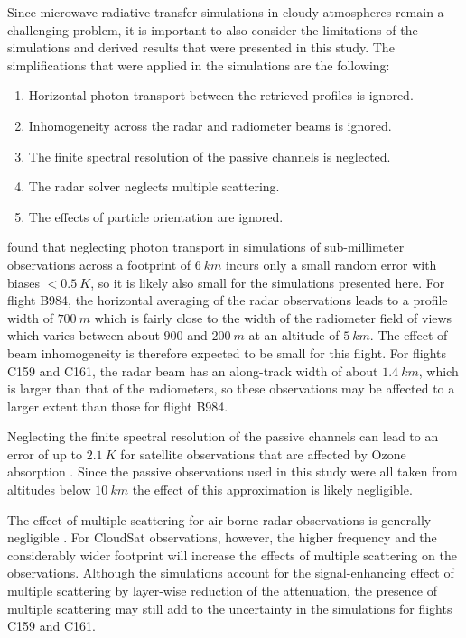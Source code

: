 \documentclass[journal abbreviation, manuscript]{copernicus}
\begin{document}
Since microwave radiative transfer simulations in cloudy atmospheres remain a
challenging problem, it is important to also consider the limitations of the
simulations and derived results that were presented in this study. The
simplifications that were applied in the simulations are the following:
\begin{enumerate}
  \item Horizontal photon transport between the retrieved profiles is ignored.
  \item Inhomogeneity across the radar and radiometer beams is ignored.
  \item The finite spectral resolution of the passive channels is neglected.
  \item The radar solver neglects multiple scattering.
  \item The effects of particle orientation are ignored.
\end{enumerate}

\citet{barlakas20} found that neglecting photon transport in simulations of
sub-millimeter observations across a footprint of $6\ \unit{km}$ incurs only a
small random error with biases $< 0.5\ \unit{K}$, so it is likely also small for
the simulations presented here. For flight B984, the horizontal averaging of the
radar observations leads to a profile width of $700\ \unit{m}$ which is fairly
close to the width of the radiometer field of views which varies between about
$900$ and $200\ \unit{m}$ at an altitude of $5\ \unit{km}$. The effect of beam
inhomogeneity is therefore expected to be small for this flight. For flights
C159 and C161, the radar beam has an along-track width of about
$1.4\ \unit{km}$, which is larger than that of the radiometers, so these
observations may be affected to a larger extent than those for flight B984.

Neglecting the finite spectral resolution of the passive channels can lead to an
error of up to $2.1\ \unit{K}$ for satellite observations that are affected by
Ozone absorption \citep{eriksson20}. Since the passive observations used in this
study were all taken from altitudes below $10\ \unit{km}$ the effect of this
approximation is likely negligible.

The effect of multiple scattering for air-borne radar observations is generally
negligible \citep{battaglia10}. For CloudSat observations, however, the higher
frequency and the considerably wider footprint will increase the effects of
multiple scattering on the observations. Although the simulations account for
the signal-enhancing effect of multiple scattering by layer-wise reduction of
the attenuation, the presence of multiple scattering may still add to the
uncertainty in the simulations for flights C159 and C161.
\end{document}
